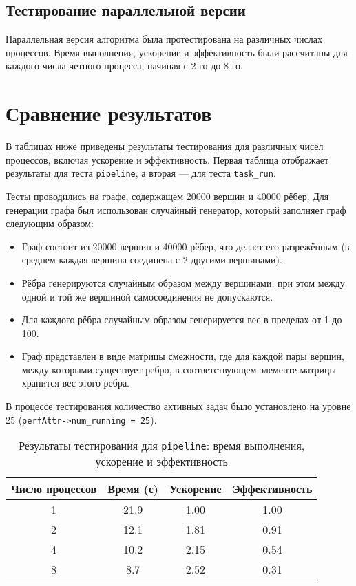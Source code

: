 \documentclass[a4paper,14pt]{extarticle}
\begin{document}
\subsection*{Тестирование параллельной версии}

Параллельная версия алгоритма была протестирована на различных числах процессов. Время выполнения, ускорение и эффективность были рассчитаны для каждого числа четного процесса, начиная с 2-го до 8-го.
\section*{Сравнение результатов}

В таблицах ниже приведены результаты тестирования для различных чисел процессов, включая ускорение и эффективность. Первая таблица отображает результаты для теста \texttt{pipeline}, а вторая — для теста \texttt{task\_run}.

Тесты проводились на графе, содержащем 20000 вершин и 40000 рёбер. Для генерации графа был использован случайный генератор, который заполняет граф следующим образом:

\begin{itemize}
    \item Граф состоит из 20000 вершин и 40000 рёбер, что делает его разрежённым (в среднем каждая вершина соединена с 2 другими вершинами).
    \item Рёбра генерируются случайным образом между вершинами, при этом между одной и той же вершиной самосоединения не допускаются.
    \item Для каждого рёбра случайным образом генерируется вес в пределах от 1 до 100.
    \item Граф представлен в виде матрицы смежности, где для каждой пары вершин, между которыми существует ребро, в соответствующем элементе матрицы хранится вес этого ребра.
\end{itemize}

В процессе тестирования количество активных задач было установлено на уровне 25 (\texttt{perfAttr->num\_running = 25}).

\begin{table}[h!]
\centering
\setlength{\tabcolsep}{3pt} 
\small
\begin{tabular}{|c|c|c|c|}  
\hline
\textbf{Число процессов} & \textbf{Время  (с)} & \textbf{Ускорение } & \textbf{Эффективность } \\ \hline
1 & 21.9 & 1.00 & 1.00 \\ \hline
2 & 12.1 & 1.81 & 0.91 \\ \hline
4 & 10.2 & 2.15 & 0.54 \\ \hline
8 & 8.7 & 2.52 & 0.31 \\ \hline
\end{tabular}
\caption{Результаты тестирования для \texttt{pipeline}: время выполнения, ускорение и эффективность}
\end{table}
\vspace*{-1cm} 
\end{document}

